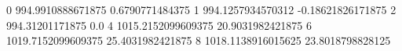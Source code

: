 0 994.9910888671875 0.6790771484375
1 994.1257934570312 -0.18621826171875
2 994.31201171875 0.0
4 1015.2152099609375 20.9031982421875
6 1019.7152099609375 25.4031982421875
8 1018.1138916015625 23.8018798828125
